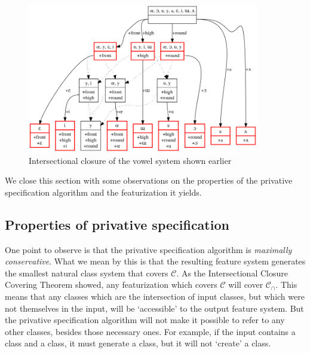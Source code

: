 \documentclass[11pt, oneside]{article}   	%
\begin{document}
\begin{figure}[h]
\includegraphics[width=0.9\textwidth]{vowelHarmony_privative.png}
\caption{Intersectional closure of the vowel system shown earlier}
\label{fig:privative}
\end{figure}

We close this section with some observations on the properties of the privative specification algorithm and the featurization it yields. 

\subsection{Properties of privative specification}

One point to observe is that the privative specification algorithm is \textit{maximally conservative}. What we mean by this is that the resulting feature system generates the smallest natural class system that covers $\mathcal C$. As the Intersectional Closure Covering Theorem showed, any featurization which covers $\mathcal C$ will cover $\mathcal C_\cap$. This means that any classes which are the intersection of input classes, but which were not themselves in the input, will be `accessible' to the output feature system. But the privative specification algorithm will not make it possible to refer to any other classes, besides those necessary ones. For example, if the input contains a  class and a  class, it must generate a  class, but it will not `create' a  class.
\end{document}
